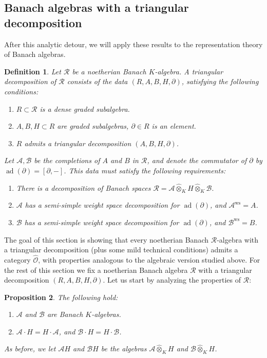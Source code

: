 \documentclass{amsart}
\newtheorem{defi}{ Definition}[subsection]
\newtheorem{prop}[defi]{ Proposition}
\newcommand{\OX}{\mathcal{O}}
\begin{document}
\subsection{\texorpdfstring{Banach algebras with a triangular decomposition}{}}\label{Section banach algebras with triangular decomp}
After this analytic detour, we will apply these results to the representation theory of Banach algebras. 
\begin{defi}\label{defi triangular decomposition of Banach algebras}
Let $\mathscr{R}$ be a noetherian Banach $K$-algebra. A triangular decomposition of $\mathscr{R}$ consists of the data $(R,A,B,H,\partial)$, satisfying the following conditions:
\begin{enumerate}[label=(\roman*)]
    \item $R\subset \mathscr{R}$ is a dense graded subalgebra.
    \item $A,B,H\subset R$ are graded subalgebras, $\partial\in R$ is an element.
    \item $R$ admits a triangular decomposition $(A,B,H,\partial)$.
\end{enumerate}
Let $\mathscr{A},\mathscr{B}$ be the completions of $A$ and $B$ in $\mathscr{R}$, and denote the commutator of $\partial$ by  $\operatorname{ad}(\partial)=[\partial,-]$. This data must satisfy the following requirements:
\begin{enumerate}[label=(\roman*)]
    \item There is a decomposition of Banach spaces $\mathscr{R}=\mathscr{A}\widehat{\otimes}_KH\widehat{\otimes}_K\mathscr{B}.$
    \item $\mathscr{A}$ has a semi-simple weight space decomposition for $\operatorname{ad}(\partial)$, and $\mathscr{A}^{\operatorname{ws}}=A$.
    \item $\mathscr{B}$ has a semi-simple weight space decomposition for $\operatorname{ad}(\partial)$, and  $\mathscr{B}^{\operatorname{ws}}=B$.
\end{enumerate}
\end{defi}
The goal of this section is showing that every noetherian Banach $\mathscr{R}$-algebra with a triangular decomposition (plus some mild technical conditions) admits a category $\widehat{\OX}$, with properties analogous to the algebraic version studied above. For the rest of this section we fix a noetherian Banach algebra $\mathscr{R}$ with a triangular decomposition $(R,A,B,H,\partial)$.  Let us start by analyzing the properties of $\mathscr{R}$:
\begin{prop}\label{prop definition AH BH}
The following hold:
\begin{enumerate}[label=(\roman*)]
    \item $\mathscr{A}$ and $\mathscr{B}$ are Banach $K$-algebras.
    \item $\mathscr{A}\cdot H=H\cdot \mathscr{A}$, and $\mathscr{B}\cdot H=H\cdot \mathscr{B}$.
\end{enumerate}
As before, we let $\mathscr{A}H$ and $\mathscr{B}H$ be the algebras $\mathscr{A}\widehat{\otimes}_KH$ and $\mathscr{B}\widehat{\otimes}_KH$.
\end{prop}
\end{document}
